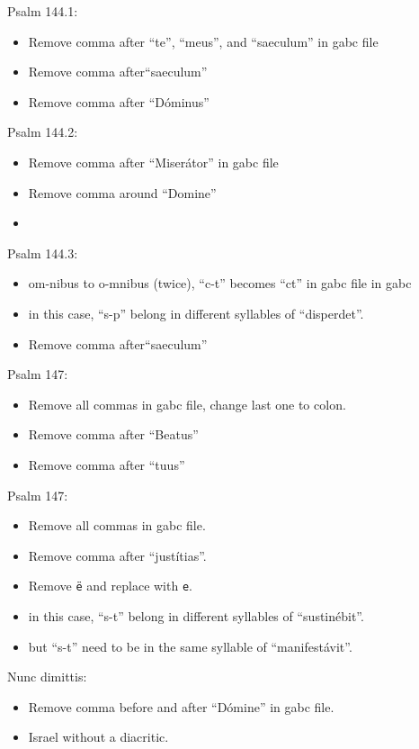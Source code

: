 \documentclass[11pt]{article}
\begin{document}
      Psalm 144.1:
  \begin{itemize}
    \item Remove comma after ``te'', ``meus'',  and ``saeculum'' in gabc file 
  \item   Remove comma after``saeculum''
    \item Remove comma after ``Dóminus'' 
    \end{itemize}

 Psalm 144.2:
  \begin{itemize}
      \item Remove comma after ``Miserátor'' in gabc file
  \item Remove comma around ``Domine''
  \item  
    \end{itemize}

 Psalm 144.3:
  \begin{itemize}
  \item om-nibus to o-mnibus (twice),  ``c-t'' becomes ``ct'' in gabc file in gabc
     \item in this case, ``s-p'' belong in different syllables of ``disperdet''.
  \item  Remove comma after``saeculum''
    \end{itemize}

 Psalm 147:
  \begin{itemize}
    \item Remove all commas in gabc file, change last one to colon.
      \item Remove comma after ``Beatus''
        \item Remove comma after ``tuus''
      \end{itemize}
  
    Psalm 147:
  \begin{itemize}
      \item Remove all commas in gabc file.
          \item Remove comma after ``justítias''.
    \item Remove \texttt{ë} and replace with \texttt{e}.
    \item in this case, ``s-t'' belong in different syllables of ``sustinébit''.
    \item but ``s-t'' need to be in the same syllable of ``manifestávit''.
  
    \end{itemize}
    
    Nunc dimittis:
    
      \begin{itemize}
  \item Remove comma before and after ``Dómine'' in gabc file.
  \item Israel without a diacritic.
  \end{itemize}
  
\end{document}
